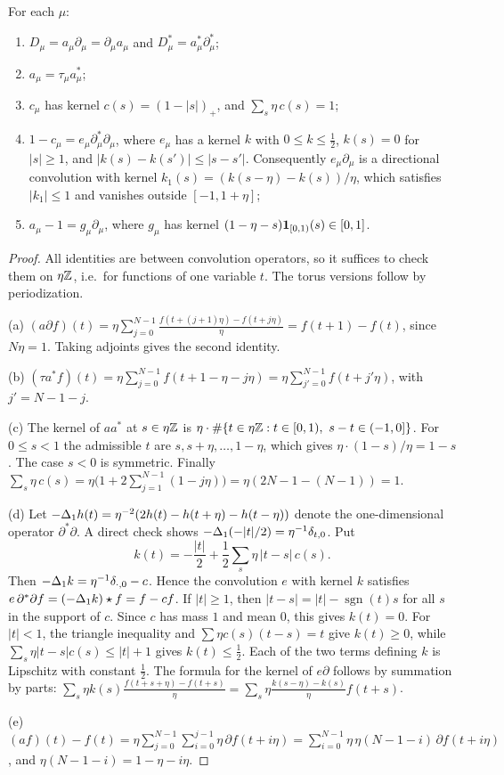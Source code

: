 \begin{lemma}\label{lem:1d}
For each $\mu$:
\begin{enumerate}[label=(\alph*)]
\item $D_\mu=a_\mu\partial_\mu=\partial_\mu a_\mu$ and $D_\mu^*=a_\mu^*\partial_\mu^*$;
\item $a_\mu=\tau_\mu a_\mu^*$;
\item $c_\mu$ has kernel $c(s)=(1-|s|)_+$, and $\sum_s\eta\,c(s)=1$;
\item $1-c_\mu=e_\mu\partial_\mu^*\partial_\mu$, where $e_\mu$ has a kernel $k$ with $0\le k\le\frac12$, $k(s)=0$ for $|s|\ge1$, and $|k(s)-k(s')|\le|s-s'|$. Consequently $e_\mu\partial_\mu$ is a directional convolution with kernel $k_1(s)=(k(s-\eta)-k(s))/\eta$, which satisfies $|k_1|\le1$ and vanishes outside $[-1,1+\eta]$;
\item $a_\mu-1=g_\mu\partial_\mu$, where $g_\mu$ has kernel $(1-\eta-s)\mathbf 1_{[0,1)}(s)\in[0,1]$.
\end{enumerate}
\end{lemma}

\begin{proof}
All identities are between convolution operators, so it suffices to check them on $\eta\mathbb Z$, i.e.\ for functions of one variable $t$. The torus versions follow by periodization.

(a) $(a\partial f)(t)=\eta\sum_{j=0}^{N-1}\frac{f(t+(j+1)\eta)-f(t+j\eta)}{\eta}=f(t+1)-f(t)$, since $N\eta=1$. Taking adjoints gives the second identity.

(b) $(\tau a^*f)(t)=\eta\sum_{j=0}^{N-1}f(t+1-\eta-j\eta)=\eta\sum_{j'=0}^{N-1}f(t+j'\eta)$, with $j'=N-1-j$.

(c) The kernel of $aa^*$ at $s\in\eta\mathbb Z$ is $\eta\cdot\#\{t\in\eta\Z: t\in[0,1),\ s-t\in(-1,0]\}$. For $0\le s<1$ the admissible $t$ are $s,s+\eta,\dots,1-\eta$, which gives $\eta\cdot(1-s)/\eta=1-s$. The case $s<0$ is symmetric. Finally $\sum_s\eta\,c(s)=\eta\big(1+2\sum_{j=1}^{N-1}(1-j\eta)\big)=\eta(2N-1-(N-1))=1$.

(d) Let $-\Delta_1h(t)=\eta^{-2}(2h(t)-h(t+\eta)-h(t-\eta))$ denote the one-dimensional operator $\partial^*\partial$. A direct check shows $-\Delta_1(-|t|/2)=\eta^{-1}\delta_{t,0}$. Put
\[
k(t)=-\frac{|t|}2+\frac12\sum_s\eta\,|t-s|\,c(s).
\]
Then $-\Delta_1k=\eta^{-1}\delta_{\cdot,0}-c$. Hence the convolution $e$ with kernel $k$ satisfies $e\,\partial^*\partial f=(-\Delta_1k)\star f=f-cf$. If $|t|\ge1$, then $|t-s|=|t|-\operatorname{sgn}(t)s$ for all $s$ in the support of $c$. Since $c$ has mass $1$ and mean $0$, this gives $k(t)=0$. For $|t|<1$, the triangle inequality and $\sum\eta c(s)(t-s)=t$ give $k(t)\ge0$, while $\sum_s\eta|t-s|c(s)\le|t|+1$ gives $k(t)\le\frac12$. Each of the two terms defining $k$ is Lipschitz with constant $\frac12$. The formula for the kernel of $e\partial$ follows by summation by parts: $\sum_s\eta k(s)\frac{f(t+s+\eta)-f(t+s)}\eta=\sum_s\eta\frac{k(s-\eta)-k(s)}\eta f(t+s)$.

(e) $(a f)(t)-f(t)=\eta\sum_{j=0}^{N-1}\sum_{i=0}^{j-1}\eta\,\partial f(t+i\eta)=\sum_{i=0}^{N-1}\eta\,\eta(N-1-i)\,\partial f(t+i\eta)$, and $\eta(N-1-i)=1-\eta-i\eta$.
\end{proof}

